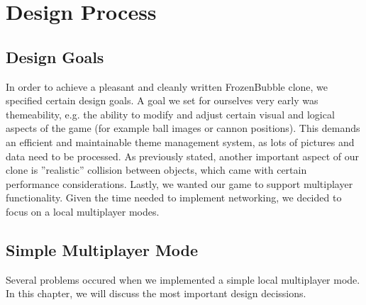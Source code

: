 \section{Design Process}
\subsection{Design Goals}
In order to achieve a pleasant and cleanly written FrozenBubble clone, we specified certain design goals.
A goal we set for ourselves very early was themeability, e.g. the ability to modify and 
adjust certain visual and logical aspects of the game (for example ball images or 
cannon positions). This demands an efficient and maintainable theme management 
system, as lots of pictures and data need to be processed.
As previously stated, another important aspect of our clone is ''realistic'' 
collision between objects, which came with certain performance considerations.
Lastly, we wanted our game to support multiplayer functionality. Given the time 
needed to implement networking, we decided to focus on a local multiplayer modes. 

\subsection{Simple Multiplayer Mode}
%
Several problems occured when we implemented a simple local multiplayer mode. In this chapter, we will discuss the most important design decissions.

